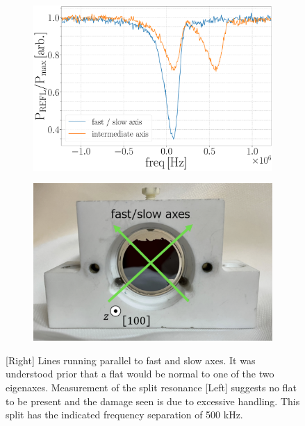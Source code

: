 \begin{figure}
    \centering
    \begin{subfigure}{.48\linewidth}
	\includegraphics[width=\linewidth]{figs/ALGAAS/split_cav_scan.pdf}
	\label{splitresonance}
    \end{subfigure}
    \begin{subfigure}{.50\linewidth}
	\includegraphics[width=\linewidth]{figs/ALGAAS/fas_axes.png}
	\label{fast_slow_axes}
    \end{subfigure}
    \caption{[Right] Lines running parallel to fast and slow axes. It was understood prior that a flat would be normal to one of the two eigenaxes. Measurement of the split resonance [Left] suggests no flat to be present and the damage seen is due to excessive handling. This split has the indicated frequency separation of 500 kHz.}
    \label{fig:split_cav_resonance}
\end{figure}

